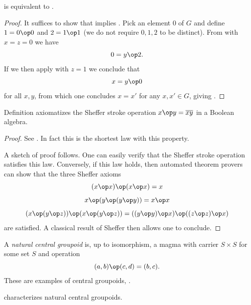 \begin{theorem}[953 is equivalent to 2]\label{953_equiv_2}\leanok  {} is equivalent to .
\end{theorem}

\begin{proof}\leanok  It suffices to show that  implies .  Pick an element $0$ of $G$ and define $1 = 0 \op 0$ and $2 = 1 \op 1$ (we do not require $0,1,2$ to be distinct).
From  with $x=z=0$ we have
$$ 0 = y \op 2.$$
If we then apply  with $z=1$ we conclude that
$$ x = y \op 0$$
for all $x,y$, from which one concludes $x=x'$ for any $x,x' \in G$, giving .
\end{proof}


\begin{theorem}\label{sheffer}\leanok  Definition 
axiomatizes the Sheffer stroke operation $x \op y = \overline{xy}$ in a Boolean algebra.
\end{theorem}

\begin{proof}\leanok
See \cite{mccune_et_al}.  In fact this is the shortest law with this property.

A sketch of proof follows.  One can easily verify that the Sheffer stroke operation satisfies this law.  Conversely, if this law holds, then automated theorem provers can show that the three Sheffer axioms
$$ (x \op x) \op (x \op x)  = x$$
$$ x \op (y \op (y \op y)) = x \op x$$
$$ (x \op (y \op z)) \op (x \op (y \op z)) = ((y \op y) \op x) \op ((z \op z) \op x)$$
are satisfied.  A classical result of Sheffer \cite{sheffer} then allows one to conclude.
\end{proof}

A \emph{natural central groupoid} is, up to isomorphism, a magma with carrier $S \times S$ for some set $S$ and operation
$$ (a,b) \op (c,d) = (b,c).$$
These are examples of central groupoids, .

\begin{theorem}\label{natural-central-groupoid}  characterizes natural central groupoids.
\end{theorem}

